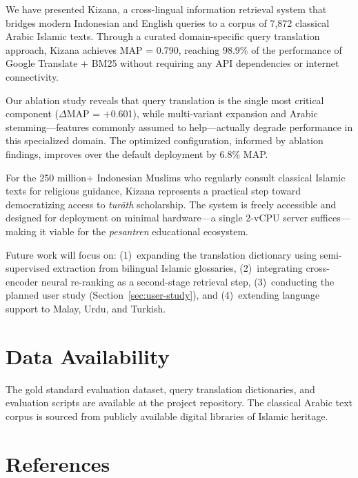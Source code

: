 \documentclass[preprint,12pt,numbers]{elsarticle}
\begin{document}
We have presented Kizana, a cross-lingual information retrieval system that bridges modern Indonesian and English queries to a corpus of 7,872 classical Arabic Islamic texts. Through a curated domain-specific query translation approach, Kizana achieves MAP = 0.790, reaching 98.9\% of the performance of Google Translate + BM25 without requiring any API dependencies or internet connectivity.

Our ablation study reveals that query translation is the single most critical component ($\Delta$MAP = $+$0.601), while multi-variant expansion and Arabic stemming---features commonly assumed to help---actually degrade performance in this specialized domain. The optimized configuration, informed by ablation findings, improves over the default deployment by 6.8\% MAP.

For the 250 million+ Indonesian Muslims who regularly consult classical Islamic texts for religious guidance, Kizana represents a practical step toward democratizing access to \textit{tur\={a}th} scholarship. The system is freely accessible and designed for deployment on minimal hardware---a single 2-vCPU server suffices---making it viable for the \textit{pesantren} educational ecosystem.

Future work will focus on: (1)~expanding the translation dictionary using semi-supervised extraction from bilingual Islamic glossaries, (2)~integrating cross-encoder neural re-ranking as a second-stage retrieval step, (3)~conducting the planned user study (Section~\ref{sec:user-study}), and (4)~extending language support to Malay, Urdu, and Turkish.

\section*{Data Availability}

The gold standard evaluation dataset, query translation dictionaries, and evaluation scripts are available at the project repository. The classical Arabic text corpus is sourced from publicly available digital libraries of Islamic heritage.

\section*{References}
\end{document}
